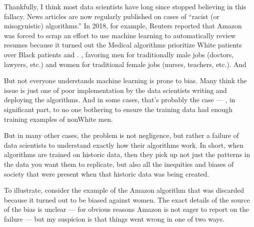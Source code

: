 \documentclass[letterpaper,10pt,english]{jupyterBook}
\begin{document}
\sphinxAtStartPar
Thankfully, I think most data scientists have long since stopped believing in this fallacy. News articles are now regularly published on cases of “racist (or misogynistic) algorithms.” In 2018, for example, Reuters reported that Amazon was forced to scrap an effort to use machine learning to automatically review resumes because it turned out the  Medical algorithms prioritize White patients over Black patients  and . , favoring men for traditionally male jobs (doctors, lawyers, etc.) and women for traditional female jobs (nurses, teachers, etc.). And 

\sphinxAtStartPar
But not everyone understands  machine learning is prone to bias. Many think the issue is just one of poor implementation by the data scientists writing and deploying the algorithms. And in some cases, that’s probably the case — , in significant part, to no one bothering to ensure the training data had enough training examples of non\sphinxhyphen{}White men.

\sphinxAtStartPar
But in many other cases, the problem is not negligence, but rather a failure of data scientists to understand exactly how their algorithms work. In short, when algorithms are trained on historic data, then  they pick up not just the patterns in the data you want them to replicate, but also all the inequities and biases of society that were present when that historic data was being created.

\sphinxAtStartPar
To illustrate, consider the example of the Amazon algorithm that was discarded because it turned out to be biased against women. The exact details of the source of the bias is unclear — for obvious reasons Amazon is not eager to report on the failure — but my suspicion is that things went wrong in one of two ways.
\end{document}
